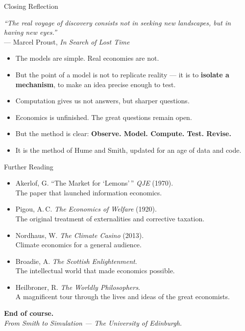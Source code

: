 \documentclass[aspectratio=169, 10pt]{beamer}
\begin{document}
\begin{frame}{Closing Reflection}
\begin{center}
\textit{``The real voyage of discovery consists not in seeking new
landscapes, but in having new eyes.''}\\[4pt]
--- Marcel Proust, \textit{In Search of Lost Time}
\end{center}
\vspace{1em}
\begin{itemize}
  \item The models are simple. Real economies are not.
  \item But the point of a model is not to replicate reality --- it is to
        \textbf{isolate a mechanism}, to make an idea precise enough to test.
  \item Computation gives us not answers, but \alert{sharper questions}.
  \item Economics is unfinished. The great questions remain open.
  \item But the method is clear: \textbf{Observe. Model. Compute. Test.
        Revise.}
  \item It is the method of Hume and Smith, updated for an age of data
        and code.
\end{itemize}
\end{frame}

\begin{frame}{Further Reading}
\begin{itemize}
  \item Akerlof, G. ``The Market for `Lemons'\,'' \textit{QJE} (1970).\\
        The paper that launched information economics.
  \item Pigou, A.\,C. \textit{The Economics of Welfare} (1920).\\
        The original treatment of externalities and corrective taxation.
  \item Nordhaus, W. \textit{The Climate Casino} (2013).\\
        Climate economics for a general audience.
  \item Broadie, A. \textit{The Scottish Enlightenment}.\\
        The intellectual world that made economics possible.
  \item Heilbroner, R. \textit{The Worldly Philosophers}.\\
        A magnificent tour through the lives and ideas of the great economists.
\end{itemize}
\vspace{1em}
\begin{center}
\textbf{End of course.}\\[4pt]
\textit{From Smith to Simulation --- The University of Edinburgh.}
\end{center}
\end{frame}
\end{document}

